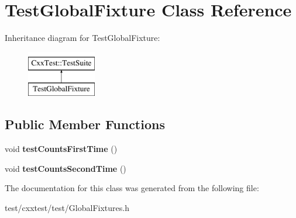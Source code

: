 \hypertarget{classTestGlobalFixture}{\section{Test\-Global\-Fixture Class Reference}
\label{classTestGlobalFixture}
}
Inheritance diagram for Test\-Global\-Fixture\-:\begin{figure}[H]
\begin{center}
\leavevmode
\includegraphics[height=2.000000cm]{classTestGlobalFixture}
\end{center}
\end{figure}
\subsection*{Public Member Functions}
\begin{DoxyCompactItemize}
\item 
\hypertarget{classTestGlobalFixture_ab01e2865b1fc4c1933d511dd2fb267d5}{void {\bfseries test\-Counts\-First\-Time} ()}\label{classTestGlobalFixture_ab01e2865b1fc4c1933d511dd2fb267d5}

\item 
\hypertarget{classTestGlobalFixture_a6a192e602ac6cc30f75444b6c4f7aff1}{void {\bfseries test\-Counts\-Second\-Time} ()}\label{classTestGlobalFixture_a6a192e602ac6cc30f75444b6c4f7aff1}

\end{DoxyCompactItemize}


The documentation for this class was generated from the following file\-:\begin{DoxyCompactItemize}
\item 
test/cxxtest/test/Global\-Fixtures.\-h\end{DoxyCompactItemize}
